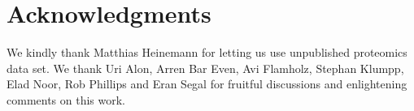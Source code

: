 \section{Acknowledgments}
We kindly thank Matthias Heinemann for letting us use unpublished proteomics data set.
We thank Uri Alon, Arren Bar Even, Avi Flamholz, Stephan Klumpp, Elad Noor, Rob Phillips and Eran Segal for fruitful discussions and enlightening comments on this work.